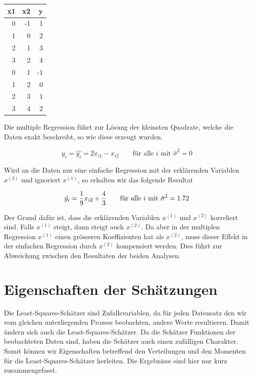 \documentclass[]{book}
\begin{document}
\begin{center}


\begin{tabular}{r|r|r}
\hline
x1 & x2 & y\\
\hline
0 & -1 & 1\\
\hline
1 & 0 & 2\\
\hline
2 & 1 & 3\\
\hline
3 & 2 & 4\\
\hline
0 & 1 & -1\\
\hline
1 & 2 & 0\\
\hline
2 & 3 & 1\\
\hline
3 & 4 & 2\\
\hline
\end{tabular}
\end{center}

Die multiple Regression führt zur Lösung der kleinsten Quadrate, welche
die Daten exakt beschreibt, so wie diese erzeugt wurden.

\begin{equation}y_i = \hat{y_i} = 2x_{i1} - x_{i2} \qquad \text{für alle } i \text{ mit } \hat{\sigma}^2 = 0\end{equation}

Wird an die Daten nur eine einfache Regression mit der erklärenden
Variablen \(x^{(2)}\) und ignoriert \(x^{(1)}\), so erhalten wir das
folgende Resultat

\begin{equation}\hat{y_i} = {1\over 9}x_{i2} + {4\over 3} \qquad \text{für alle } i \text{ mit } \hat{\sigma}^2 = 1.72\end{equation}

Der Grund dafür ist, dass die erklärenden Variablen \(x^{(1)}\) und
\(x^{(2)}\) korreliert sind. Falls \(x^{(1)}\) steigt, dann steigt auch
\(x^{(2)}\). Da aber in der multiplen Regression \(x^{(1)}\) einen
grösseren Koeffizienten hat als \(x^{(2)}\), muss dieser Effekt in der
einfachen Regression durch \(x^{(2)}\) kompensiert werden. Dies führt
zur Abweichung zwischen den Resultaten der beiden Analysen.

\section{Eigenschaften der
Schätzungen}\label{eigenschaften-der-schatzungen}

Die Least-Squares-Schätzer sind Zufallsvariablen, da für jeden Datensatz
den wir vom gleichen unterliegenden Prozess beobachten, andere Werte
resultieren. Damit ändern sich auch die Least-Squares-Schätzer. Da die
Schätzer Funktionen der beobachteten Daten sind, haben die Schätzer auch
einen zufälligen Charakter. Somit können wir Eigenschaften betreffend
den Verteilungen und den Momenten für die Least-Squares-Schätzer
herleiten. Die Ergebnisse sind hier nur kurz zusammengefasst.
\end{document}
